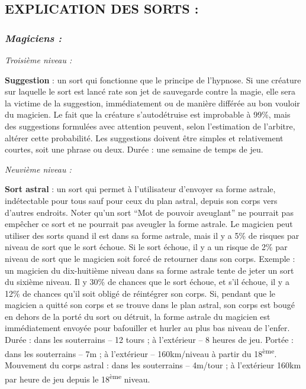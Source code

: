 \documentclass[11pt]{article}
\begin{document}
{%
\subsection*{EXPLICATION DES SORTS :}

\subsubsection*{\textit{Magiciens :}}

\textit{Troisième niveau :}

\bigskip

\label{sort-suggestion}\textbf{Suggestion} : un sort qui fonctionne que le principe de l'hypnose. Si une créature sur laquelle le sort est lancé rate son jet de sauvegarde contre la magie, elle sera la victime de la suggestion, immédiatement ou de manière différée au bon vouloir du magicien. Le fait que la créature s'autodétruise est improbable à 99\%, mais des suggestions formulées avec attention peuvent, selon l'estimation de l'arbitre, altérer cette probabilité. Les suggestions doivent être simples et relativement courtes, soit une phrase ou deux. Durée : une semaine de temps de jeu.

\bigskip

\textit{Neuvième niveau :}

\bigskip

\label{sort-astral}\textbf{Sort astral} : un sort qui permet à l'utilisateur d'envoyer sa forme astrale, indétectable pour tous sauf pour ceux du plan astral, depuis son corps vers d'autres endroits. Noter qu'un sort ``Mot de pouvoir aveuglant'' ne pourrait pas empêcher ce sort et ne pourrait pas aveugler la forme astrale. Le magicien peut utiliser des sorts quand il est dans sa forme astrale, mais il y a 5\% de risques par niveau de sort que le sort échoue. Si le sort échoue, il y a un risque de 2\% par niveau de sort que le magicien soit forcé de retourner dans son corps. Exemple : un magicien du dix-huitième niveau dans sa forme astrale tente de jeter un sort du sixième niveau. Il y  30\% de chances que le sort échoue, et s'il échoue, il y a 12\% de chances qu'il soit obligé de réintégrer son corps. Si, pendant que le magicien a quitté son corps et se trouve dans le plan astral, son corps est bougé en dehors de la porté du sort ou détruit, la forme astrale du magicien est immédiatement envoyée pour bafouiller et hurler au plus bas niveau de l'enfer. Durée : dans les souterrains -- 12 tours ; à l'extérieur -- 8 heures de jeu. Portée : dans les souterrains -- 7m ; à l'extérieur -- 160km/niveau à partir du 18\textsuperscript{ème}. Mouvement du corps astral : dans les souterrains -- 4m/tour ; à l'extérieur 160km par heure de jeu depuis le 18\textsuperscript{ème} niveau.


}
\end{document}

